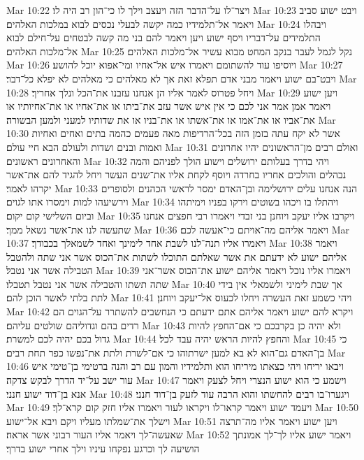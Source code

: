 Mar 10:22  ויצר־לו על־הדבר הזה ויעצב וילך לו כי־הון רב היה לו׃
Mar 10:23  ויבט ישוע סביב ויאמר אל־תלמידיו כמה יקשה לבעלי נכסים לבוא במלכות האלהים׃
Mar 10:24  ויבהלו התלמידים על־דבריו ויסף ישוע ויען ויאמר להם בני מה קשה לבטחים על־חילם לבוא אל־מלכות האלהים׃
Mar 10:25  נקל לגמל לעבר בנקב המחט מבוא עשיר אל־מלכות האלהים׃
Mar 10:26  ויוסיפו עוד להשתומם ויאמרו איש אל־אחיו ומי־אפוא יוכל להושע׃
Mar 10:27  ויבט־בם ישוע ויאמר מבני אדם תפלא זאת אך לא מאלהים כי מאלהים לא יפלא כל־דבר׃
Mar 10:28  ויחל פטרוס לאמר אליו הן אנחנו עזבנו את־הכל ונלך אחריך׃
Mar 10:29  ויען ישוע ויאמר אמן אמר אני לכם כי אין איש אשר עזב את־ביתו או את־אחיו או את־אחיותיו או את־אביו או את־אמו או את־אשתו או את־בניו או את שדותיו למעני ולמען הבשורה׃
Mar 10:30  אשר לא יקח עתה בזמן הזה בכל־הרדיפות מאה פעמים כהמה בתים ואחים ואחיות ואמות ובנים ושדות ולעולם הבא חיי עולם׃
Mar 10:31  ואולם רבים מן־הראשונים יהיו אחרונים והאחרונים ראשונים׃
Mar 10:32  ויהי בדרך בעלותם ירושלים וישוע הולך לפניהם והמה נבהלים והולכים אחריו בחרדה ויוסף לקחת אליו את־שנים העשר ויחל להגיד להם את־אשר יקרהו לאמר׃
Mar 10:33  הנה אנחנו עלים ירושלימה ובן־האדם ימסר לראשי הכהנים ולסופרים וירשיעהו למות וימסרו אתו לגוים׃
Mar 10:34  ויהתלו בו ויכהו בשוטים וירקו בפניו וימיתהו וביום השלישי קום יקום׃
Mar 10:35  ויקרבו אליו יעקב ויוחנן בני זבדי ויאמרו רבי חפצים אנחנו שתעשה לנו את־אשר נשאל ממך׃
Mar 10:36  ויאמר אליהם מה־אויתם כי־אעשה לכם׃
Mar 10:37  ויאמרו אליו תנה־לנו לשבת אחד לימינך ואחד לשמאלך בכבודך׃
Mar 10:38  ויאמר אליהם ישוע לא ידעתם את אשר שאלתם התוכלו לשתות את־הכוס אשר אני שתה ולהטבל הטבילה אשר אני נטבל׃
Mar 10:39  ויאמרו אליו נוכל ויאמר אליהם ישוע את־הכוס אשר־אני שתה תשתו והטבילה אשר אני נטבל תטבלו׃
Mar 10:40  אך שבת לימיני ולשמאלי אין בידי לתת בלתי לאשר הוכן להם׃
Mar 10:41  ויהי כשמע זאת העשרה ויחלו לכעוס אל־יעקב ויוחנן׃
Mar 10:42  ויקרא להם ישוע ויאמר אליהם אתם ידעתם כי הנחשבים להשתרר על־הגוים הם רדים בהם וגדוליהם שולטים עליהם׃
Mar 10:43  ולא יהיה כן בקרבכם כי אם־החפץ להיות גדול בכם יהיה לכם למשרת׃
Mar 10:44  והחפץ להיות הראש יהיה עבד לכל׃
Mar 10:45  כי בן־האדם גם־הוא לא בא למען ישרתוהו כי אם־לשרת ולתת את־נפשו כפר תחת רבים׃
Mar 10:46  ויבאו יריחו ויהי כצאתו מיריחו הוא ותלמידיו והמון עם רב והנה ברטימי בן־טימי איש עור ישב על־יד הדרך לבקש צדקה׃
Mar 10:47  וישמע כי הוא ישוע הנצרי ויחל לצעק ויאמר אנא בן־דוד ישוע חנני׃
Mar 10:48  ויגערו־בו רבים להחשתו והוא הרבה עוד לזעק בן־דוד חנני׃
Mar 10:49  ויעמד ישוע ויאמר קראו־לו ויקראו לעור ויאמרו אליו חזק קום קרא־לך׃
Mar 10:50  וישלך את־שמלתו מעליו ויקם ויבא אל־ישוע׃
Mar 10:51  ויען ישוע ויאמר אליו מה־תרצה שאעשה־לך ויאמר אליו העור רבוני אשר אראה׃
Mar 10:52  ויאמר ישוע אליו לך־לך אמונתך הושיעה לך וכרגע נפקחו עיניו וילך אחרי ישוע בדרך׃
